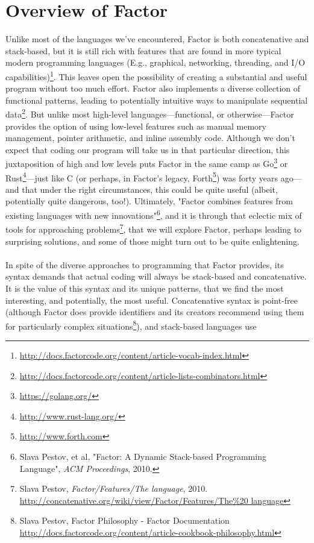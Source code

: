 \documentclass{sig-alternate}
\begin{document}
\section{Overview of Factor}
Unlike most of the languages we've encountered, Factor is both concatenative and stack-based, but it is still rich with
features that are found in more typical modern programming languages
(E.g., graphical, networking, threading, and I/O capabilities)\footnote{\url{http://docs.factorcode.org/content/article-vocab-index.html}}. This
leaves open the possibility of creating a substantial and useful
program without too much effort. Factor also implements a diverse
collection of functional patterns, leading to potentially intuitive ways to manipulate sequential data\footnote{\url{http://docs.factorcode.org/content/article-lists-combinators.html}}. But unlike most high-level languages---functional, or otherwise---Factor provides the option of using low-level
 features such as manual memory management, pointer arithmetic,
and inline assembly code. Although we don't expect that coding our
program will take us in that particular direction, this
juxtaposition of high and low levels puts Factor in the same camp as Go\footnote{\url{https://golang.org/}} or Rust\footnote{\url{http://www.rust-lang.org/}}---just like C (or perhaps, in Factor's legacy, Forth\footnote{\url{http://www.forth.com}}) was forty years ago---and that under the right circumstances, this could be
quite useful (albeit, potentially quite dangerous, too!).  Ultimately, "Factor combines features from existing languages with new
innovations"\footnote{Slava Pestov, et al, "Factor: A Dynamic Stack-based Programming Language", \textit{ACM Proceedings}, 2010.}, and it is through that eclectic mix of tools for approaching problems\footnote{Slava Pestov, \textit{Factor/Features/The language}, 2010. \url{http://concatenative.org/wiki/view/Factor/Features/The\%20 language}}, that we will explore Factor, perhaps leading to surprising solutions, and some of those might turn out to be quite enlightening.
\\\\
In spite of the diverse approaches to programming that Factor
provides, its syntax demands that actual coding will always be stack-based
 and concatenative. It is the value of this syntax and its unique
patterns, that we find the most interesting, and potentially, the most
useful. Concatenative syntax is point-free (although Factor does
provide identifiers and its creators recommend using them for
particularly complex situations\footnote{Slava Pestov, Factor Philosophy - Factor Documentation \url{http://docs.factorcode.org/content/article-cookbook-philosophy.html}}), and stack-based languages use
\end{document}
